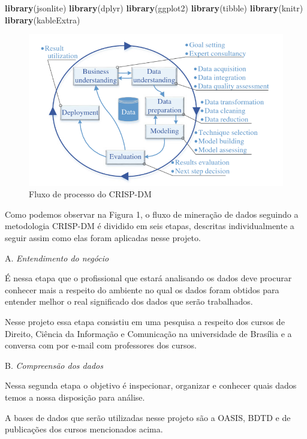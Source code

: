 \documentclass[]{article}
\newenvironment{Shaded}{\begin{snugshade}}{\end{snugshade}}
\newcommand{\KeywordTok}[1]{\textcolor[rgb]{0.13,0.29,0.53}{\textbf{#1}}}
\newcommand{\NormalTok}[1]{#1}
\begin{document}
\begin{Shaded}
\begin{Highlighting}[]
\KeywordTok{library}\NormalTok{(jsonlite)}
\KeywordTok{library}\NormalTok{(dplyr)}
\KeywordTok{library}\NormalTok{(ggplot2)}
\KeywordTok{library}\NormalTok{(tibble)}
\KeywordTok{library}\NormalTok{(knitr)}
\KeywordTok{library}\NormalTok{(kableExtra)}
\end{Highlighting}
\end{Shaded}

\begin{figure}
\centering
\includegraphics{CRISPDM.png}
\caption{Fluxo de processo do CRISP-DM}
\end{figure}

Como podemos observar na Figura 1, o fluxo de mineração de dados
seguindo a metodologia CRISP-DM é dividido em seis etapas, descritas
individualmente a seguir assim como elas foram aplicadas nesse projeto.

A. \emph{Entendimento do negócio}

É nessa etapa que o profissional que estará analisando os dados deve
procurar conhecer mais a respeito do ambiente no qual os dados foram
obtidos para entender melhor o real significado dos dados que serão
trabalhados.

Nesse projeto essa etapa consistiu em uma pesquisa a respeito dos cursos
de Direito, Ciência da Informação e Comunicação na universidade de
Brasília e a conversa com por e-mail com professores dos cursos.

B. \emph{Compreensão dos dados}

Nessa segunda etapa o objetivo é inspecionar, organizar e conhecer quais
dados temos a nossa disposição para análise.

A bases de dados que serão utilizadas nesse projeto são a OASIS, BDTD e
de publicações dos cursos mencionados acima.
\end{document}
